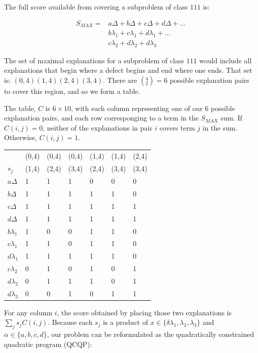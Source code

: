 \documentclass[11pt,twocolumn]{article}
\begin{document}
The full score available from covering a subproblem of class $111$ is:

\begin{align*} 
S_{MAX} = &a \Delta + b \Delta + c \Delta + d \Delta + \hdots \\
& b \lambda_1 + c\lambda_1 + d\lambda_1 + \hdots \\
& c \lambda_2 + d \lambda_2 + d \lambda_3
\end{align*}

The set of maximal explanations for a subproblem of class $111$ would include all explanations that begin where a defect begins and end where one ends.  That set is: $ (0,4) (1,4) (2,4) (3,4)$.  There are $(^4_2) = 6$ possible explanation pairs to cover this region, and so we form a table.

The table, $C$ is $6 \times 10$, with each column representing one of our 6 possible explanation pairs, and each row corresponging to a term in the $S_{MAX}$ sum.  If $C(i,j) = 0$, neither of the explanations in pair $i$ covers term $j$ in the sum. Otherwise, $C(i,j) = 1$.

\begin{tabular}{l|llllll}
      & (0,4) & (0,4) & (0,4) & (1,4) & (1,4) & (2,4) \\
$s_j$ & (1,4) & (2,4) & (3,4) & (2,4) & (3,4) & (3,4) \\ \hline
$a\Delta$ & 1 & 1 & 1 & 0 & 0 & 0 \\
$b\Delta$ & 1 & 1 & 1 & 1 & 1 & 0 \\
$c\Delta$ & 1 & 1 & 1 & 1 & 1 & 1 \\
$d\Delta$ & 1 & 1 & 1 & 1 & 1 & 1 \\
$b \lambda_1$ & 1 & 0 & 0 & 1 & 1 & 0 \\
$c \lambda_1$ & 1 & 1 & 0 & 1 & 1 & 0\\
$d \lambda_1$ & 1 & 1 & 1 & 1 & 1 & 0 \\
$c \lambda_2$ & 0 & 1 & 0 & 1 & 0 & 1\\
$d \lambda_2$ & 0 & 1 & 1 & 1 & 0 & 1\\
$d \lambda_3$ & 0 & 0 & 1 & 0 & 1 & 1\\
\end{tabular}

For any column $i$, the score obtained by placing those two explanations is $\sum_j s_j C(i,j)$.  Because each $s_j$ is a product of $x \in \{ \delta \lambda_1, \lambda_2, \lambda_3 \}$ and $\alpha \in \{ a, b, c, d \}$, our problem can be reformulated as the quadratically constrained quadratic program (QCQP):
\end{document}
